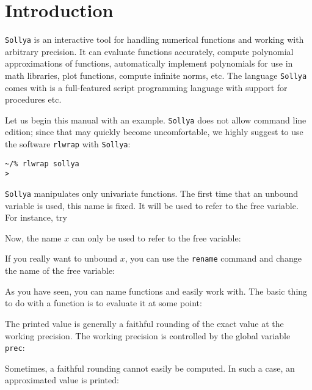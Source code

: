 \documentclass[a4paper]{article}
\newcommand{\com}[1]{\texttt{#1}}
\newcommand{\sollya}{\texttt{Sollya}\xspace}
\newcommand{\rlwrap}{\texttt{rlwrap}\xspace}
\begin{document}
\section{Introduction}
\sollya is an interactive tool for handling numerical functions and working with arbitrary precision. It can evaluate functions accurately, compute polynomial approximations of functions, automatically implement polynomials for use in math libraries, plot functions, compute infinite norms, etc. The language \sollya comes with is a full-featured script programming language with support for procedures etc. 

Let us begin this manual with an example. \sollya does not allow command line edition; since that may quickly become uncomfortable, we highly suggest to use the software \rlwrap with \sollya:

\begin{center}\begin{minipage}{15cm}\begin{Verbatim}[frame=single]
~/% rlwrap sollya
>
\end{Verbatim}
\end{minipage}\end{center}

\sollya manipulates only univariate functions. The first time that an unbound variable is used, this name is fixed. It will be used to refer to the free variable. For instance, try



Now, the name $x$ can only be used to refer to the free variable:



If you really want to unbound $x$, you can use the \com{rename} command and change the name of the free variable:



As you have seen, you can name functions and easily work with. The basic thing to do with a function is to evaluate it at some point:



The printed value is generally a faithful rounding of the exact value at the working precision. The working precision is controlled by the global variable \com{prec}:



Sometimes, a faithful rounding cannot easily be computed. In such a case, an approximated value is printed:
\end{document}
